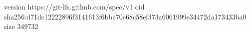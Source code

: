 version https://git-lfs.github.com/spec/v1
oid sha256:d71dc12222896f3141613f6bbe70e68c58ef373a6061999e34472da173433ba0
size 349732
